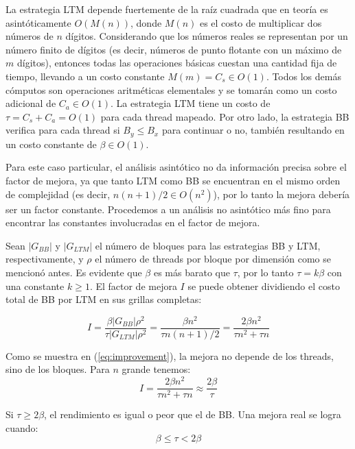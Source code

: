 \documentclass[twocolumn,10pt,a4paper]{article}
\begin{document}
La estrategia LTM depende fuertemente de la raíz cuadrada que en teoría es
asintóticamente $O(M(n))$, donde $M(n)$ es el costo de
multiplicar dos números de $n$ dígitos. Considerando que los números reales se
representan por un número finito de dígitos (es decir, números de punto
flotante con un máximo de $m$ dígitos), entonces todas las operaciones básicas
cuestan una cantidad fija de tiempo, llevando a un costo constante
$M(m) = C_s \in O(1)$. Todos los demás cómputos son operaciones aritméticas
elementales y se tomarán como un costo adicional de $C_a \in O(1)$. La
estrategia LTM tiene un costo de $\tau = C_s + C_a = O(1)$ para cada thread
mapeado. Por otro lado, la estrategia BB verifica para cada thread si
$B_y \leq B_x$ para continuar o no, también resultando en un costo constante
de $\beta \in O(1)$.

Para este caso particular, el análisis asintótico no da información precisa
sobre el factor de mejora, ya que tanto LTM como BB se encuentran en el mismo
orden de complejidad (es decir, $n(n+1)/2 \in O(n^2)$), por lo tanto la
mejora debería ser un factor constante. Procedemos a un análisis no asintótico
más fino para encontrar las constantes involucradas en el factor de mejora.

Sean $|G_{BB}|$ y $|G_{LTM}|$ el número de bloques para las estrategias BB y
LTM, respectivamente, y $\rho$ el número de threads por bloque por dimensión
como se mencionó antes. Es evidente que $\beta$ es más barato que $\tau$, por
lo tanto $\tau = k\beta$ con una constante $k \geq 1$. El factor de mejora $I$
se puede obtener dividiendo el costo total de BB por LTM en sus grillas
completas:

\begin{equation}
I = \frac{\beta |G_{BB}| \rho^2}{\tau |G_{LTM}| \rho^2} =
 \frac{\beta n^2}{\tau n(n+1)/2} =
 \frac{2\beta n^2}{\tau n^2 + \tau n}
\label{eq:improvement}
\end{equation}

Como se muestra en (\ref{eq:improvement}), la mejora no depende de los
threads, sino de los bloques. Para $n$ grande tenemos:
\begin{equation}
I = \frac{2\beta n^2}{\tau n^2 + \tau n} \approx \frac{2\beta}{\tau}
\label{eq:improvement_large}
\end{equation}

Si $\tau \geq 2\beta$, el rendimiento es igual o peor que el de BB.
Una mejora real se logra cuando:
\begin{equation}
\beta \leq \tau < 2\beta
\label{eq:real_improvement}
\end{equation}
\end{document}
